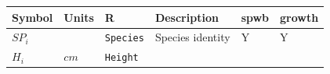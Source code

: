 \documentclass[]{book}
\begin{document}
\begin{longtable}[]{@{}llllll@{}}
\toprule
\begin{minipage}[b]{0.10\columnwidth}\raggedright\strut
Symbol\strut
\end{minipage} & \begin{minipage}[b]{0.09\columnwidth}\raggedright\strut
Units\strut
\end{minipage} & \begin{minipage}[b]{0.06\columnwidth}\raggedright\strut
R\strut
\end{minipage} & \begin{minipage}[b]{0.43\columnwidth}\raggedright\strut
Description\strut
\end{minipage} & \begin{minipage}[b]{0.07\columnwidth}\raggedright\strut
spwb\strut
\end{minipage} & \begin{minipage}[b]{0.07\columnwidth}\raggedright\strut
growth\strut
\end{minipage}\tabularnewline
\midrule
\endhead
\begin{minipage}[t]{0.10\columnwidth}\raggedright\strut
\(SP_i\)\strut
\end{minipage} & \begin{minipage}[t]{0.09\columnwidth}\raggedright\strut
\strut
\end{minipage} & \begin{minipage}[t]{0.06\columnwidth}\raggedright\strut
\texttt{Species}\strut
\end{minipage} & \begin{minipage}[t]{0.43\columnwidth}\raggedright\strut
Species identity\strut
\end{minipage} & \begin{minipage}[t]{0.07\columnwidth}\raggedright\strut
Y\strut
\end{minipage} & \begin{minipage}[t]{0.07\columnwidth}\raggedright\strut
Y\strut
\end{minipage}\tabularnewline
\begin{minipage}[t]{0.10\columnwidth}\raggedright\strut
\(H_i\)\strut
\end{minipage} & \begin{minipage}[t]{0.09\columnwidth}\raggedright\strut
\(cm\)\strut
\end{minipage} & \begin{minipage}[t]{0.06\columnwidth}\raggedright\strut
\texttt{Height}\strut
\end{minipage} & \begin{minipage}[t]{0.43\columnwidth}\raggedright\strut

\end{minipage}
\end{longtable}
\end{document}
